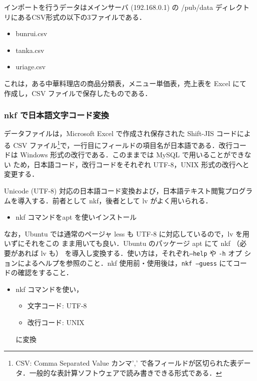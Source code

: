 インポートを行うデータはメインサーバ (192.168.0.1) の /pub/data ディレクトリにあるCSV形式の以下の3ファイルである．
\begin{itemize}
 \item bunrui.csv
 \item tanka.csv
 \item uriage.csv
\end{itemize}

これは，ある中華料理店の商品分類表，メニュー単価表，売上表を Excel にて作成し，CSV ファイルで保存したものである．


\subsubsection{nkf で日本語文字コード変換}

データファイルは，Microsoft Excel で作成され保存された Shift-JIS コードによる CSV ファイル\footnote{CSV: Comma Separated Value カンマ',' で各フィールドが区切られた表データ．一般的な表計算ソフトウェアで読み書きできる形式である．}で，一行目にフィールドの項目名が日本語である．改行コードは Windows 形式の改行である．このままでは MySQL で用いることができない
ため，日本語コード，改行コードをそれぞれ UTF-8，UNIX 形式の改行へと変更する．

Unicode (UTF-8) 対応の日本語コード変換および，日本語テキスト閲覧プログラムを導入する．前者として nkf，後者として lv がよく用いられる．

\begin{itemize}
    \item nkf コマンドをapt を使いインストール
\end{itemize}

なお，Ubuntu では通常のページャ less も UTF-8 に対応しているので，lv を用いずにそれをこの
まま用いても良い．Ubuntu のパッケージ apt にて nkf （必要があれば lv も）
を導入し変換する．使い方は，それぞれ\texttt{--help} や \texttt{-h} オプ
ションによるヘルプを参照のこと．nkf 使用前・使用後は，\texttt{nkf
--guess} にてコードの確認をすること．

\begin{itemize}
    \item nkf コマンドを使い，
    \begin{itemize}
        \item 文字コード: UTF-8
        \item 改行コード: UNIX
    \end{itemize}
    に変換
\end{itemize}

